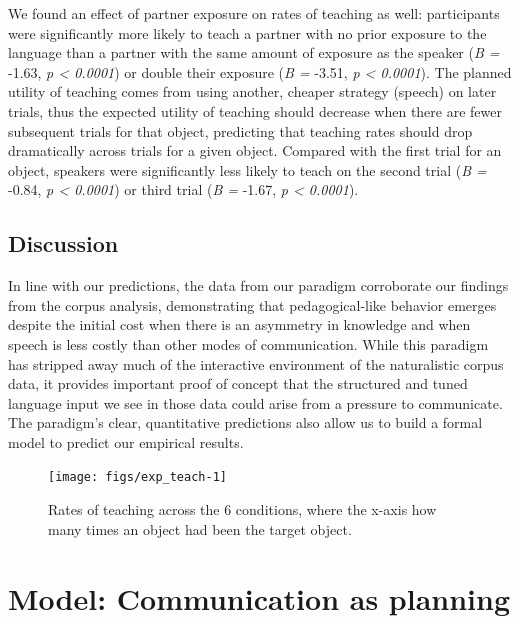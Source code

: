 \documentclass[10pt, letterpaper]{article}
\newenvironment{CodeChunk}{}{}
\begin{document}
We found an effect of partner exposure on rates of teaching as well:
participants were significantly more likely to teach a partner with no
prior exposure to the language than a partner with the same amount of
exposure as the speaker (\emph{B =} -1.63, \emph{p \textless{} 0.0001})
or double their exposure (\emph{B =} -3.51, \emph{p \textless{}
0.0001}). The planned utility of teaching comes from using another,
cheaper strategy (speech) on later trials, thus the expected utility of
teaching should decrease when there are fewer subsequent trials for that
object, predicting that teaching rates should drop dramatically across
trials for a given object. Compared with the first trial for an object,
speakers were significantly less likely to teach on the second trial
(\emph{B =} -0.84, \emph{p \textless{} 0.0001}) or third trial (\emph{B
=} -1.67, \emph{p \textless{} 0.0001}).

\subsection{Discussion}\label{discussion-1}

In line with our predictions, the data from our paradigm corroborate our
findings from the corpus analysis, demonstrating that pedagogical-like
behavior emerges despite the initial cost when there is an asymmetry in
knowledge and when speech is less costly than other modes of
communication. While this paradigm has stripped away much of the
interactive environment of the naturalistic corpus data, it provides
important proof of concept that the structured and tuned language input
we see in those data could arise from a pressure to communicate. The
paradigm's clear, quantitative predictions also allow us to build a
formal model to predict our empirical results.

\begin{CodeChunk}
\begin{figure}[tb]
\texttt{[image: figs/exp\_teach-1]} \caption[Rates of teaching across the 6 conditions, where the x-axis how many times an object had been the target object]{Rates of teaching across the 6 conditions, where the x-axis how many times an object had been the target object.}\label{fig:exp_teach}
\end{figure}
\end{CodeChunk}

\section{Model: Communication as
planning}\label{model-communication-as-planning}
\end{document}
